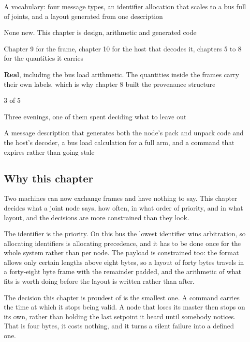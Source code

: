 
\begin{keyfacts}
\item[Adds to the node] A vocabulary: four message types, an identifier allocation that scales to a bus full of joints, and a layout generated from one description
\item[Peripherals] None new. This chapter is design, arithmetic and generated code
\item[Depends on] Chapter 9 for the frame, chapter 10 for the host that decodes it, chapters 5 to 8 for the quantities it carries
\item[Real or modelled] \textbf{Real}, including the bus load arithmetic. The quantities inside the frames carry their own labels, which is why chapter 8 built the provenance structure
\item[Difficulty] 3 of 5
\item[Effort] Three evenings, one of them spent deciding what to leave out
\item[Deliverable] A message description that generates both the node's pack and unpack code and the host's decoder, a bus load calculation for a full arm, and a command that expires rather than going stale
\end{keyfacts}

\subsection*{Why this chapter}

Two machines can now exchange frames and have nothing to say. This chapter
decides what a joint node says, how often, in what order of priority, and in
what layout, and the decisions are more constrained than they look.

The identifier is the priority. On this bus the lowest identifier wins
arbitration, so allocating identifiers is allocating precedence, and it has to
be done once for the whole system rather than per node. The payload is
constrained too: the format allows only certain lengths above eight bytes, so a
layout of forty bytes travels in a forty-eight byte frame with the remainder
padded, and the arithmetic of what fits is worth doing before the layout is
written rather than after.

The decision this chapter is proudest of is the smallest one. A command carries
the time at which it stops being valid. A node that loses its master then stops
on its own, rather than holding the last setpoint it heard until somebody
notices. That is four bytes, it costs nothing, and it turns a silent failure
into a defined one.

